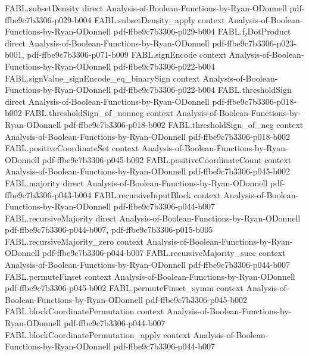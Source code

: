 \begin{theorem}
\proofstep
  {FABL.subsetDensity}
  {direct}
  {Analysis-of-Boolean-Functions-by-Ryan-ODonnell}
  {pdf-ffbe9c7b3306-p029-b004}
\proofstep
  {FABL.subsetDensity_apply}
  {context}
  {Analysis-of-Boolean-Functions-by-Ryan-ODonnell}
  {pdf-ffbe9c7b3306-p029-b004}
\proofstep
  {FABL.f₂DotProduct}
  {direct}
  {Analysis-of-Boolean-Functions-by-Ryan-ODonnell}
  {pdf-ffbe9c7b3306-p023-b001,
    pdf-ffbe9c7b3306-p071-b009}
\proofstep
  {FABL.signEncode}
  {context}
  {Analysis-of-Boolean-Functions-by-Ryan-ODonnell}
  {pdf-ffbe9c7b3306-p022-b004}
\proofstep
  {FABL.signValue_signEncode_eq_binarySign}
  {context}
  {Analysis-of-Boolean-Functions-by-Ryan-ODonnell}
  {pdf-ffbe9c7b3306-p022-b004}
\proofstep
  {FABL.thresholdSign}
  {direct}
  {Analysis-of-Boolean-Functions-by-Ryan-ODonnell}
  {pdf-ffbe9c7b3306-p018-b002}
\proofstep
  {FABL.thresholdSign_of_nonneg}
  {context}
  {Analysis-of-Boolean-Functions-by-Ryan-ODonnell}
  {pdf-ffbe9c7b3306-p018-b002}
\proofstep
  {FABL.thresholdSign_of_neg}
  {context}
  {Analysis-of-Boolean-Functions-by-Ryan-ODonnell}
  {pdf-ffbe9c7b3306-p018-b002}
\proofstep
  {FABL.positiveCoordinateSet}
  {context}
  {Analysis-of-Boolean-Functions-by-Ryan-ODonnell}
  {pdf-ffbe9c7b3306-p045-b002}
\proofstep
  {FABL.positiveCoordinateCount}
  {context}
  {Analysis-of-Boolean-Functions-by-Ryan-ODonnell}
  {pdf-ffbe9c7b3306-p045-b002}
\proofstep
  {FABL.majority}
  {direct}
  {Analysis-of-Boolean-Functions-by-Ryan-ODonnell}
  {pdf-ffbe9c7b3306-p043-b004}
\proofstep
  {FABL.recursiveInputBlock}
  {context}
  {Analysis-of-Boolean-Functions-by-Ryan-ODonnell}
  {pdf-ffbe9c7b3306-p044-b007}
\proofstep
  {FABL.recursiveMajority}
  {direct}
  {Analysis-of-Boolean-Functions-by-Ryan-ODonnell}
  {pdf-ffbe9c7b3306-p044-b007,
    pdf-ffbe9c7b3306-p015-b005}
\proofstep
  {FABL.recursiveMajority_zero}
  {context}
  {Analysis-of-Boolean-Functions-by-Ryan-ODonnell}
  {pdf-ffbe9c7b3306-p044-b007}
\proofstep
  {FABL.recursiveMajority_succ}
  {context}
  {Analysis-of-Boolean-Functions-by-Ryan-ODonnell}
  {pdf-ffbe9c7b3306-p044-b007}
\proofstep
  {FABL.permuteFinset}
  {context}
  {Analysis-of-Boolean-Functions-by-Ryan-ODonnell}
  {pdf-ffbe9c7b3306-p045-b002}
\proofstep
  {FABL.permuteFinset_symm}
  {context}
  {Analysis-of-Boolean-Functions-by-Ryan-ODonnell}
  {pdf-ffbe9c7b3306-p045-b002}
\proofstep
  {FABL.blockCoordinatePermutation}
  {context}
  {Analysis-of-Boolean-Functions-by-Ryan-ODonnell}
  {pdf-ffbe9c7b3306-p044-b007}
\proofstep
  {FABL.blockCoordinatePermutation_apply}
  {context}
  {Analysis-of-Boolean-Functions-by-Ryan-ODonnell}
  {pdf-ffbe9c7b3306-p044-b007}

\end{theorem}
